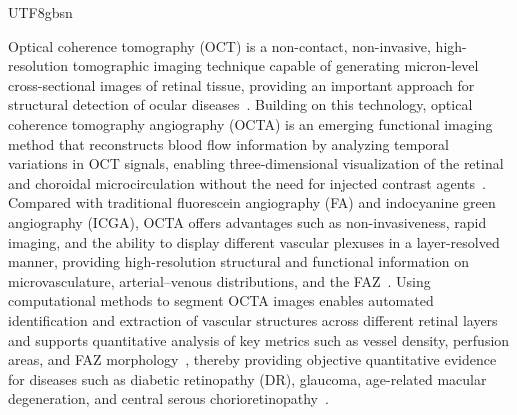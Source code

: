 \documentclass[times, review, 10pt]{elsarticle}
\begin{document}
\begin{CJK}{UTF8}{gbsn}
\par
Optical coherence tomography (OCT) is a non-contact, non-invasive, high-resolution tomographic imaging technique capable of generating micron-level cross-sectional images of retinal tissue, providing an important approach for structural detection of ocular diseases~\cite{ref30}. Building on this technology, optical coherence tomography angiography (OCTA) is an emerging functional imaging method that reconstructs blood flow information by analyzing temporal variations in OCT signals, enabling three-dimensional visualization of the retinal and choroidal microcirculation without the need for injected contrast agents~\cite{ref31}. Compared with traditional fluorescein angiography (FA) and indocyanine green angiography (ICGA), OCTA offers advantages such as non-invasiveness, rapid imaging, and the ability to display different vascular plexuses in a layer-resolved manner, providing high-resolution structural and functional information on microvasculature, arterial–venous distributions, and the FAZ~\cite{ref33}. Using computational methods to segment OCTA images enables automated identification and extraction of vascular structures across different retinal layers and supports quantitative analysis of key metrics such as vessel density, perfusion areas, and FAZ morphology~\cite{ref35}, thereby providing objective quantitative evidence for diseases such as diabetic retinopathy (DR), glaucoma, age-related macular degeneration, and central serous chorioretinopathy~\cite{ref36}.
\par

\end{CJK}
\end{document}
